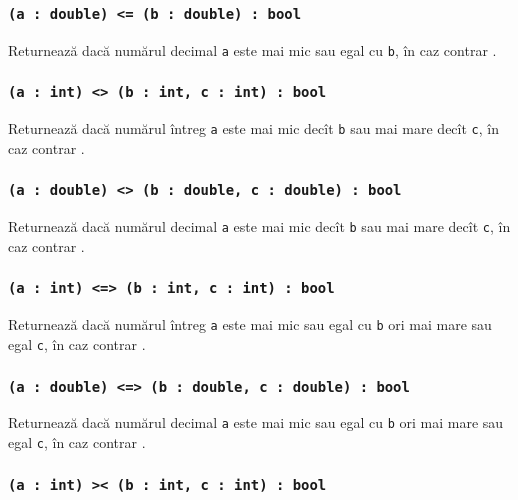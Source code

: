 \subsubsection{\texttt{(a : double) <= (b : double) : bool}}

Returnează \true{} dacă numărul decimal \texttt{a} este mai mic sau egal cu \texttt{b}, în caz contrar \false{}.

\subsubsection{\texttt{(a : int) <> (b : int, c : int) : bool}}

Returnează \true{} dacă numărul întreg \texttt{a} este mai mic decît \texttt{b} sau mai mare decît \texttt{c}, în caz contrar \false{}.

\subsubsection{\texttt{(a : double) <> (b : double, c : double) : bool}}

Returnează \true{} dacă numărul decimal \texttt{a} este mai mic decît \texttt{b} sau mai mare decît \texttt{c}, în caz contrar \false{}.

\subsubsection{\texttt{(a : int) <=> (b : int, c : int) : bool}}

Returnează \true{} dacă numărul întreg \texttt{a} este mai mic sau egal cu \texttt{b} ori mai mare sau egal \texttt{c}, în caz contrar \false{}.

\subsubsection{\texttt{(a : double) <=> (b : double, c : double) : bool}}

Returnează \true{} dacă numărul decimal \texttt{a} este mai mic sau egal cu \texttt{b} ori mai mare sau egal \texttt{c}, în caz contrar \false{}.

\subsubsection{\texttt{(a : int) >< (b : int, c : int) : bool}}

